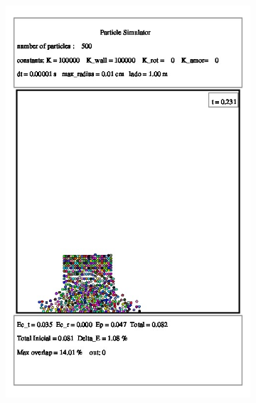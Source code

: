 \documentclass[a4paper,11pt]{article}
\begin{document}
\begin{figure}[!hto]
\hspace{-1 cm}
	\begin{subfigure}{0.5\textwidth}
		\includegraphics[scale=0.4]{./images/time_2.jpeg}
		\caption{}
	\end{subfigure}
\hspace{2 cm}
	\begin{subfigure}{0.5\textwidth}

\end{subfigure}
\end{figure}
\end{document}
